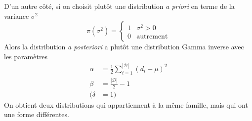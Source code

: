 \documentclass{article}
\numberwithin{equation}{section}
\begin{document}
D'un autre côté, si on choisit plutôt une distribution \textit{a priori} en terme 
de la variance $\sigma^2$
\[
        \pi(\sigma^2) = 
        \left\{ 
\begin{matrix}
        1 & \sigma^2 > 0 \\
        0 & \text{autrement}
\end{matrix}
        \right.
\]
Alors la distribution \textit{a posteriori} a plutôt une distribution Gamma inverse avec 
les paramètres
\begin{align*}
        \alpha &=  \frac{1}{2}\sum_{i = 1}^{|\mathcal{D}|} (d_i - \mu)^{2} \\
        \beta &= \frac{|\mathcal{D}|}{2} - 1 \\
        (\delta &=  1)
\end{align*}
On obtient deux distributions qui appartiennent à la même famille, mais qui ont une 
forme différentes.
\end{document}
